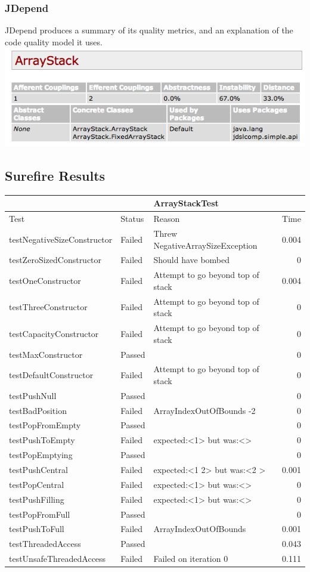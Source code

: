 \documentclass [12pt, a4paper, twoside, titlepage] {article}
\begin{document}
\subsubsection{JDepend}
JDepend produces a summary of its quality metrics, and an explanation of the code quality model it uses.\\

\includegraphics[width=16cm]{jdepend.png}


\subsection{Surefire Results}

\begin{tabularx}{\textwidth}{lllr}
\hline
 & & \textbf{ArrayStackTest} & \\
\hline
Test & Status & Reason & Time \\
\hline 
testNegativeSizeConstructor  & Failed & Threw  NegativeArraySizeException &  0.004 \\
testZeroSizedConstructor  & Failed &  Should have bombed &  0 \\
testOneConstructor & Failed & Attempt to go beyond top of stack &  0.004 \\
testThreeConstructor  & Failed &  Attempt to go beyond top of stack & 0 \\
testCapacityConstructor  & Failed &  Attempt to go beyond top of stack & 0 \\
testMaxConstructor  & Passed &  &  0 \\
testDefaultConstructor  &  Failed & Attempt to go beyond top of stack & 0 \\
testPushNull& Passed & & 0\\
testBadPosition  &  Failed & ArrayIndexOutOfBounds -2 & 0\\
testPopFromEmpty & Passed & & 0\\
testPushToEmpty  &  Failed & expected:<1> but was:<> & 0\\
testPopEmptying& Passed & & 0\\
testPushCentral  &  Failed & expected:<1 2> but was:<2 > & 0.001\\
testPopCentral  & Failed & expected:<1> but was:<> & 0\\
testPushFilling  &  Failed & expected:<1> but was:<> & 0 \\
testPopFromFull& Passed & & 0 \\
testPushToFull  &  Failed & ArrayIndexOutOfBounds & 0.001 \\
testThreadedAccess& Passed & & 0.043 \\
testUnsafeThreadedAccess  & Failed &  Failed on iteration 0 & 0.111\\
\hline 
\end{tabularx}
\end{document}
